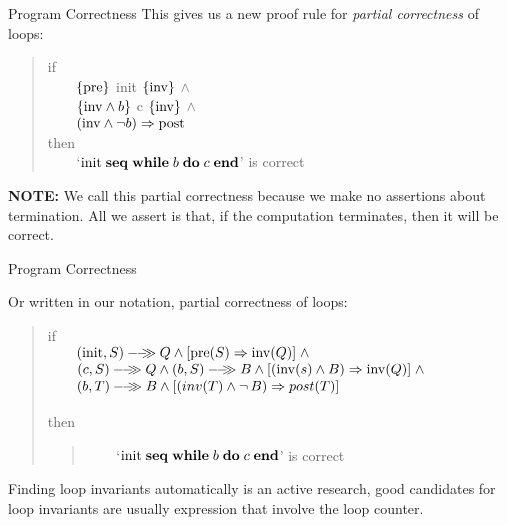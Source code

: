 \documentclass{beamer}
\begin{document}
\begin{frame}[fragile]{Program Correctness}
This gives us a new proof rule for {\em partial correctness} of loops:
\begin{quote}
if\\
{\verb"    "}$\{\rm pre\}$ {\rm init} $\{\rm inv\}$ $\wedge$\\
{\verb"    "}$\{{\rm inv} \wedge b\}$ c $\{\rm inv\}$ $\wedge$\\
{\verb"    "}$({\rm inv} \wedge \neg b) \Rightarrow {\rm post}$\\
then\\
{\verb"    "}`${\rm init}\; {\bf seq}\; {\bf while}\; {b}\;{\bf do}\;{c}\; \mbox{\bf end}$' is correct\\
\end{quote}

{\bf NOTE: } We call this partial correctness because we make no assertions about termination.
All we assert is that, if the computation terminates, then it will be correct.

\end{frame}


\begin{frame}[fragile]{Program Correctness}

\small

Or written in our notation, partial correctness of loops:
\begin{quote}
if\\
{\verb"    "}${({\rm init},S)}-\!\!-\!\!\!\!\gg{Q} \wedge [{\rm pre}(S)\Rightarrow {\rm inv}(Q)]\; \wedge$\\ 
{\verb"    "}$\sem{(c,S)}{Q} \wedge \sem{(b,S)}{B} \wedge [({\rm inv}(s) \wedge B)\Rightarrow {\rm inv}(Q)]\; \wedge$\\
{\verb"    "}${(b,T)}-\!\!-\!\!\!\!\gg{B} \wedge [(inv(T) \wedge \neg\,B) \Rightarrow post(T)]$\\
{\verb"    "}\\
then 
\begin{quote}
{\verb"    "}`${\rm init}\; {\bf seq}\; {\bf while}\; {b}\;{\bf do}\;{c}\; \mbox{\bf end}$'  is correct\\
\end{quote}
\end{quote}


\vspace{.2in}
Finding loop invariants automatically  is an active research, good candidates for loop invariants are usually expression
that involve the loop counter.
\end{frame}
\end{document}
